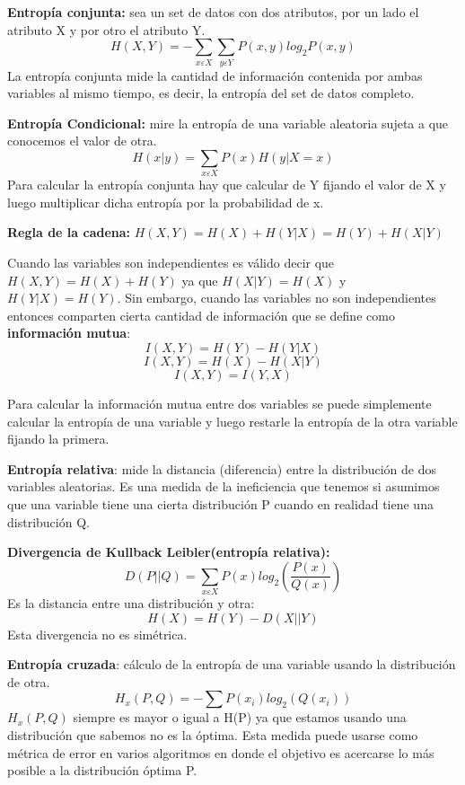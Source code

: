 \documentclass[titlepage,a4paper]{article}
\begin{document}
\textbf{Entropía conjunta:} sea un set de datos con dos atributos, por un lado el atributo X y por otro el atributo Y. $$H(X,Y) = -\sum_{x\varepsilon X} \sum_{y\varepsilon Y}P(x,y)log_2P(x,y)$$
La entropía conjunta mide la cantidad de información contenida por ambas variables al mismo tiempo, es decir, la entropía del set de datos completo. 

\textbf{Entropía Condicional:} mire la entropía de una variable aleatoria sujeta a que conocemos el valor de otra. $$H(x|y) = \sum_{x\varepsilon X} P(x)H(y|X=x) $$ Para calcular la entropía conjunta hay que calcular de Y fijando el valor de X y luego multiplicar dicha entropía por la probabilidad de x. 

\textbf{Regla de la cadena:} $H(X,Y) = H(X)+H(Y|X) = H(Y) + H(X|Y)$

Cuando las variables son independientes es válido decir que $H(X,Y) = H(X) + H(Y)$ ya que $H(X|Y) = H(X)$ y $H(Y|X) = H(Y)$. Sin embargo, cuando las variables no son independientes entonces comparten cierta cantidad de información que se define como \textbf{información mutua}: $$I(X,Y) = H(Y) -H(Y|X)$$$$I(X,Y) = H(X) -H(X|Y)$$ $$I(X,Y) = I(Y,X)$$

Para calcular la información mutua entre dos variables se puede simplemente calcular la entropía de una variable y luego restarle la entropía de la otra variable fijando la primera. 

\textbf{Entropía relativa}: mide la distancia (diferencia) entre la distribución de dos variables aleatorias. Es una medida de la ineficiencia que tenemos si  asumimos que una variable tiene una cierta distribución P cuando en realidad tiene una distribución Q.

\textbf{Divergencia de Kullback Leibler(entropía relativa): } $$D(P||Q) = \sum_{x \varepsilon X} P(x) log_2\left( \frac{P(x)}{Q(x)}\right) $$
Es la distancia entre una distribución y otra: $$H(X) = H(Y) - D(X||Y)$$ Esta divergencia no es simétrica. 

\textbf{Entropía cruzada}: cálculo de la entropía de una variable usando la distribución de otra. $$H_x(P,Q) = - \sum P(x_i) log_2(Q(x_i))$$ $H_x(P,Q)$ siempre es mayor o igual a H(P) ya que estamos usando una distribución que sabemos no es la óptima. Esta medida puede usarse como métrica de error en varios algoritmos en donde el objetivo es acercarse lo más posible a la distribución óptima P. 
\end{document}
